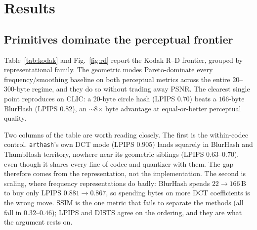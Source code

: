 \documentclass[11pt]{article}
\begin{document}
\section{Results}

\subsection{Primitives dominate the perceptual frontier}\label{sec:rd}
Table~\ref{tab:kodak} and Fig.~\ref{fig:rd} report the Kodak R--D frontier,
grouped by representational family. The geometric modes Pareto-dominate every
frequency/smoothing baseline on both perceptual metrics across the entire
$20$--$300$-byte regime, and they do so without trading away PSNR. The clearest
single point reproduces on CLIC: a $20$-byte circle hash (LPIPS $0.70$) beats a
$166$-byte BlurHash (LPIPS $0.82$), an $\sim$8$\times$ byte advantage at
equal-or-better perceptual quality.

Two columns of the table are worth reading closely. The first is the
within-codec control. \texttt{arthash}'s own DCT mode (LPIPS $0.905$) lands
squarely in BlurHash and ThumbHash territory, nowhere near its geometric
siblings (LPIPS $0.63$--$0.70$), even though it shares every line of codec and
quantizer with them. The gap therefore comes from the representation, not the
implementation. The second is scaling, where frequency representations do badly:
BlurHash spends $22{\to}166$\,B to buy only LPIPS $0.881{\to}0.867$, so spending
bytes on more DCT coefficients is the wrong move. SSIM is the one metric that
fails to separate the methods (all fall in $0.32$--$0.46$); LPIPS and DISTS agree
on the ordering, and they are what the argument rests on.
\end{document}
